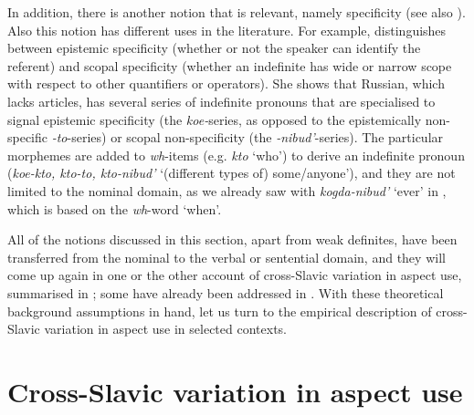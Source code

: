 \documentclass[output=paper,colorlinks,citecolor=brown]{langscibook}
\begin{document}
In addition, there is another notion that is relevant, namely specificity (see also ). Also this notion has different uses in the literature. For example, \citet{geist10a} distinguishes between epistemic specificity (whether or not the speaker can identify the referent) and scopal specificity (whether an indefinite has wide or narrow scope with respect to other quantifiers or operators). She shows that Russian, which lacks articles, has several series of indefinite pronouns that are specialised to signal epistemic specificity (the \textit{koe-}series, as opposed to the epistemically non-specific \textit{-to}-series) or scopal non-specificity (the \textit{-nibud'}-series). The particular morphemes are added to \textit{wh}-items (e.g. \textit{kto} `who') to derive an indefinite pronoun (\textit{koe-kto, kto-to, kto-nibud'} `(different types of) some/any\-one'), and they are not limited to the nominal domain, as we already saw with \textit{kogda-nibud'} `ever' in , which is based on the \textit{wh}-word `when'.

All of the notions discussed in this section, apart from weak definites, have been transferred from the nominal to the verbal or sentential domain, and they will come up again in one or the other account of cross-Slavic variation in aspect use, summarised in ; some have already been addressed in . With these theoretical background assumptions in hand, let us turn to the empirical description of cross-Slavic variation in aspect use in selected contexts.

\section{Cross-Slavic variation in aspect use}
\label{sec:crossslav}
\end{document}
